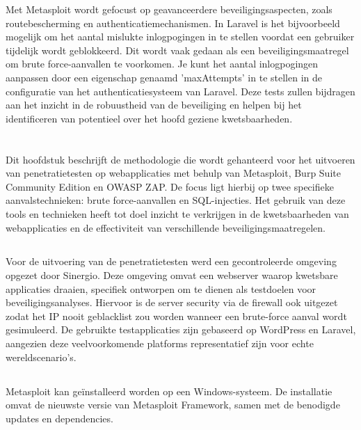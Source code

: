 Met Metasploit wordt gefocust op geavanceerdere beveiligingsaspecten, zoals routebescherming en authenticatiemechanismen.
In Laravel is het bijvoorbeeld mogelijk om het aantal mislukte inlogpogingen in te stellen voordat een gebruiker tijdelijk wordt geblokkeerd. Dit wordt vaak gedaan 
als een beveiligingsmaatregel om brute force-aanvallen te voorkomen. Je kunt het aantal inlogpogingen aanpassen door een eigenschap genaamd 
'maxAttempts' in te stellen in de configuratie van het authenticatiesysteem van Laravel. Deze tests zullen 
bijdragen aan het inzicht in de robuustheid van de beveiliging en helpen bij het identificeren van potentieel over het hoofd geziene kwetsbaarheden.

\section{}
Dit hoofdstuk beschrijft de methodologie die wordt gehanteerd voor het uitvoeren van penetratietesten op webapplicaties met behulp van Metasploit, 
Burp Suite Community Edition en OWASP ZAP. De focus ligt hierbij op twee specifieke aanvalstechnieken: brute force-aanvallen en SQL-injecties. 
Het gebruik van deze tools en technieken heeft tot doel inzicht te verkrijgen in de kwetsbaarheden van webapplicaties en de effectiviteit van 
verschillende beveiligingsmaatregelen.

\subsection{}
Voor de uitvoering van de penetratietesten werd een gecontroleerde omgeving opgezet door Sinergio. Deze omgeving omvat een webserver waarop kwetsbare 
applicaties draaien, specifiek ontworpen om te dienen als testdoelen voor beveiligingsanalyses. Hiervoor is de server security via de firewall ook uitgezet zodat 
het IP nooit geblacklist zou worden wanneer een brute-force aanval wordt gesimuleerd. De gebruikte testapplicaties zijn gebaseerd 
op WordPress en Laravel, aangezien deze veelvoorkomende platforms representatief zijn voor echte wereldscenario's.

\subsection{}
Metasploit kan geïnstalleerd worden op een Windows-systeem. De installatie omvat de nieuwste versie van Metasploit Framework, samen met de 
benodigde updates en dependencies.

